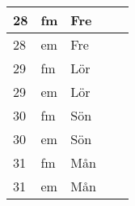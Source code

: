 \documentclass[a4paper]{article}
\begin{document}
\begin{table}[ht!]
\begin{tabular}{lllp{7cm}p{7cm}}
\multicolumn{1}{|l|}{28} & \multicolumn{1}{l|}{fm} & \multicolumn{1}{l|}{Fre} & \multicolumn{1}{l|}{} & \multicolumn{1}{l|}{} \\ \hline
\multicolumn{1}{|l|}{28} & \multicolumn{1}{l|}{em} & \multicolumn{1}{l|}{Fre} & \multicolumn{1}{l|}{} & \multicolumn{1}{l|}{} \\ \hline    

\multicolumn{1}{|l|}{29} & \multicolumn{1}{l|}{fm} & \multicolumn{1}{l|}{Lör} & \multicolumn{1}{l|}{} & \multicolumn{1}{l|}{} \\ \hline
\multicolumn{1}{|l|}{29} & \multicolumn{1}{l|}{em} & \multicolumn{1}{l|}{Lör} & \multicolumn{1}{l|}{} & \multicolumn{1}{l|}{} \\ \hline    

\multicolumn{1}{|l|}{30} & \multicolumn{1}{l|}{fm} & \multicolumn{1}{l|}{Sön} & \multicolumn{1}{l|}{} & \multicolumn{1}{l|}{} \\ \hline
\multicolumn{1}{|l|}{30} & \multicolumn{1}{l|}{em} & \multicolumn{1}{l|}{Sön} & \multicolumn{1}{l|}{} & \multicolumn{1}{l|}{} \\ \hline    

\multicolumn{1}{|l|}{31} & \multicolumn{1}{l|}{fm} & \multicolumn{1}{l|}{Mån} & \multicolumn{1}{l|}{} & \multicolumn{1}{l|}{} \\ \hline
\multicolumn{1}{|l|}{31} & \multicolumn{1}{l|}{em} & \multicolumn{1}{l|}{Mån} & \multicolumn{1}{l|}{} & \multicolumn{1}{l|}{} \\ \hline    

    \end{tabular}
    \end{table}
    
\end{document}
